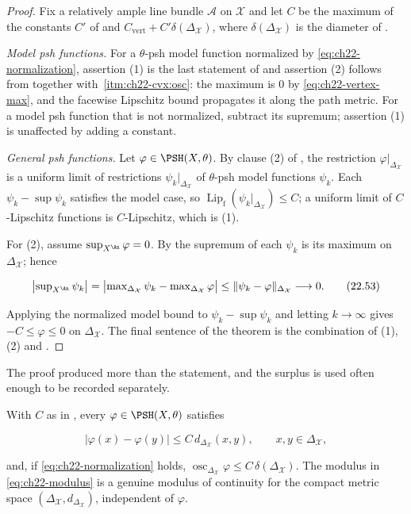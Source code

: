 \begin{proof}
Fix a relatively ample line bundle $\mathcal A$ on $\mathcal X$ and let
$C$ be the maximum of the constants $C'$ of
 and
$C_{\mathrm{vert}}+C'\delta(\Delta_{\mathcal X})$, where
$\delta(\Delta_{\mathcal X})$ is the diameter of
.

\emph{Model psh functions.}  For a $\theta$-psh model function normalized
by \eqref{eq:ch22-normalization}, assertion (1) is the last statement of
 and assertion (2) follows from
 together with
\,\cref{itm:ch22-cvx:osc}: the maximum
is $0$ by \eqref{eq:ch22-vertex-max}, and the facewise Lipschitz bound
propagates it along the path metric.  For a model psh function that is not
normalized, subtract its supremum; assertion (1) is unaffected by adding a
constant.

\emph{General psh functions.}  Let $\varphi\in\PSH(X,\theta)$.  By clause
(2) of , the restriction
$\varphi|_{\Delta_{\mathcal X}}$ is a uniform limit of restrictions
$\psi_k|_{\Delta_{\mathcal X}}$ of $\theta$-psh model functions
$\psi_k$.  Each $\psi_k-\sup\psi_k$ satisfies the model case, so
$\operatorname{Lip}_{\mathrm f}(\psi_k|_{\Delta_{\mathcal X}})\leq C$; a
uniform limit of $C$-Lipschitz functions is $C$-Lipschitz, which is (1).

For (2), assume $\sup_{X^{\An}}\varphi=0$.  By
 the supremum of each $\psi_k$ is its
maximum on $\Delta_{\mathcal X}$; hence

\[
 \bigl|\sup\nolimits_{X^{\An}}\psi_k\bigr|
 =\bigl|\max\nolimits_{\Delta_{\mathcal X}}\psi_k
    -\max\nolimits_{\Delta_{\mathcal X}}\varphi\bigr|
 \leq\|\psi_k-\varphi\|_{\Delta_{\mathcal X}}\longrightarrow0 .
\tag{22.53}\label{eq:ch22-normalizing-constants-vanish}
\]

Applying the normalized model bound to $\psi_k-\sup\psi_k$ and letting
$k\to\infty$ gives $-C\leq\varphi\leq0$ on
$\Delta_{\mathcal X}$.  The final sentence of the theorem is the
combination of (1), (2) and .
\end{proof}

The proof produced more than the statement, and the surplus is used often
enough to be recorded separately.

\begin{corollary}
\label{cor:ch22-explicit-modulus}
With $C$ as in , every
$\varphi\in\PSH(X,\theta)$ satisfies

\[
 \bigl|\varphi(x)-\varphi(y)\bigr|\leq C\,d_{\Delta_{\mathcal X}}(x,y),
 \qquad x,y\in\Delta_{\mathcal X},
\tag{22.54}\label{eq:ch22-modulus}
\]

and, if \eqref{eq:ch22-normalization} holds,
$\operatorname{osc}_{\Delta_{\mathcal X}}\varphi
\leq C\,\delta(\Delta_{\mathcal X})$.  The modulus in
\eqref{eq:ch22-modulus} is a genuine modulus of continuity for the compact
metric space $(\Delta_{\mathcal X},d_{\Delta_{\mathcal X}})$, independent
of $\varphi$.
\end{corollary}

